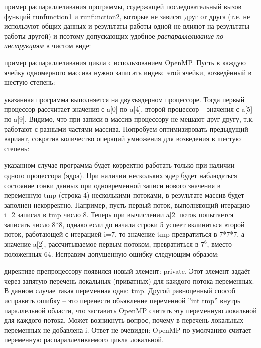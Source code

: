 {	 пример распараллеливания программы, содержащей последовательный вызов функций run\textunderscore function1 и run\textunderscore function2, которые не зависят друг от друга (т.е. не используют общих данных и результаты работы одной не влияют на результаты работы другой) и поэтому допускающих удобное \textit{распараллеливание по инструкциям} в чистом виде:
	\begin{figure}[H]
		
	\end{figure}
	 пример распараллеливания цикла с использованием OpenMP. Пусть в каждую ячейку одномерного массива нужно записать индекс этой ячейки, возведённый в шестую степень:
	\begin{figure}[H]
		
	\end{figure}
	 указанная программа выполняется на двухъядерном процессоре. Тогда первый процессор рассчитает значения с a[0] по a[4], второй процессор – значения с a[5] по a[9]. Видимо, что при записи в массив процессору не мешают друг другу, т.к. работают с разными частями массива. Попробуем оптимизировать предыдущий вариант, сократив количество операций умножения для возведения в шестую степень:
	\begin{figure}[H]
		
	\end{figure}
	 указанном случае программа будет корректно работать только при наличии одного процессора (ядра). При наличии нескольких ядер будет наблюдаться состояние гонки данных при одновременной записи нового значения в переменную tmp (строка 4) несколькими потоками, в результате массив будет заполнен некорректно. Например, пусть первый поток, выполняющий итерацию i=2 записал в tmp число 8. Теперь при вычислении a[2] поток попытается записать число 8*8, однако если до начала строки 5 успеет вклиниться второй поток, работающей с итерацией i=7, то значение tmp превратиться в 7*7*7, а значение a[2], рассчитываемое первым потоком, превратиться в $7^6$, вместо положенных 64. Исправим допущенную ошибку следующим образом:
	\begin{figure}[H]
		
	\end{figure}
	 директиве препроцессору появился новый элемент: private. Этот элемент задаёт через запятую перечень локальных (приватных) для каждого потока переменных. В данном случае такая переменная одна: tmp. Другой равноценный способ исправить ошибку – это перенести объявление переменной ''int tmp'' внутрь параллельной области, что заставить OpenMP считать эту переменную локальной для каждого потока. Может возникнуть вопрос, почему в перечень локальных переменных не добавлена i. Ответ не очевиден: OpenMP по умолчанию считает переменную распараллеливаемого цикла локальной.
}
